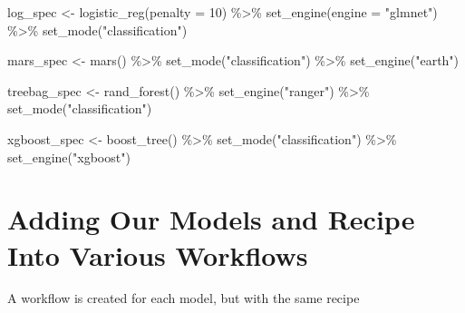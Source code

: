 \documentclass[
]{article}
\newenvironment{Shaded}{\begin{snugshade}}{\end{snugshade}}
\newcommand{\AttributeTok}[1]{\textcolor[rgb]{0.77,0.63,0.00}{#1}}
\newcommand{\DecValTok}[1]{\textcolor[rgb]{0.00,0.00,0.81}{#1}}
\newcommand{\FunctionTok}[1]{\textcolor[rgb]{0.00,0.00,0.00}{#1}}
\newcommand{\NormalTok}[1]{#1}
\newcommand{\OtherTok}[1]{\textcolor[rgb]{0.56,0.35,0.01}{#1}}
\newcommand{\SpecialCharTok}[1]{\textcolor[rgb]{0.00,0.00,0.00}{#1}}
\newcommand{\StringTok}[1]{\textcolor[rgb]{0.31,0.60,0.02}{#1}}
\begin{document}
\begin{Shaded}
\begin{Highlighting}[]
\NormalTok{log\_spec }\OtherTok{\textless{}{-}} \FunctionTok{logistic\_reg}\NormalTok{(}\AttributeTok{penalty =} \DecValTok{10}\NormalTok{) }\SpecialCharTok{\%\textgreater{}\%}
  \FunctionTok{set\_engine}\NormalTok{(}\AttributeTok{engine =} \StringTok{"glmnet"}\NormalTok{) }\SpecialCharTok{\%\textgreater{}\%}
  \FunctionTok{set\_mode}\NormalTok{(}\StringTok{"classification"}\NormalTok{)}

\NormalTok{mars\_spec }\OtherTok{\textless{}{-}} \FunctionTok{mars}\NormalTok{() }\SpecialCharTok{\%\textgreater{}\%}
  \FunctionTok{set\_mode}\NormalTok{(}\StringTok{"classification"}\NormalTok{) }\SpecialCharTok{\%\textgreater{}\%} 
  \FunctionTok{set\_engine}\NormalTok{(}\StringTok{"earth"}\NormalTok{)}

\NormalTok{treebag\_spec }\OtherTok{\textless{}{-}} \FunctionTok{rand\_forest}\NormalTok{() }\SpecialCharTok{\%\textgreater{}\%}
  \FunctionTok{set\_engine}\NormalTok{(}\StringTok{"ranger"}\NormalTok{) }\SpecialCharTok{\%\textgreater{}\%} 
  \FunctionTok{set\_mode}\NormalTok{(}\StringTok{"classification"}\NormalTok{)}

\NormalTok{xgboost\_spec }\OtherTok{\textless{}{-}} \FunctionTok{boost\_tree}\NormalTok{() }\SpecialCharTok{\%\textgreater{}\%} 
  \FunctionTok{set\_mode}\NormalTok{(}\StringTok{"classification"}\NormalTok{) }\SpecialCharTok{\%\textgreater{}\%} 
  \FunctionTok{set\_engine}\NormalTok{(}\StringTok{"xgboost"}\NormalTok{)}
\end{Highlighting}
\end{Shaded}

\hypertarget{adding-our-models-and-recipe-into-various-workflows}{%
\section{Adding Our Models and Recipe Into Various
Workflows}\label{adding-our-models-and-recipe-into-various-workflows}}

A workflow is created for each model, but with the same recipe
\end{document}
